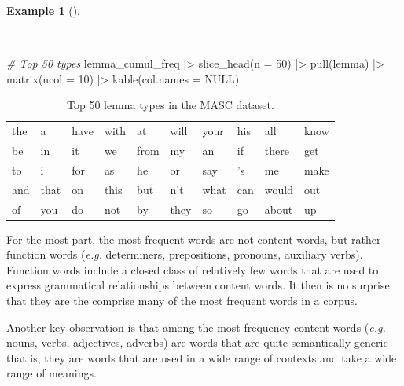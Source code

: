 \documentclass[
  letterpaper,
]{latex/krantz}
\newenvironment{Shaded}{\begin{snugshade}}{\end{snugshade}}
\newcommand{\AttributeTok}[1]{\textcolor[rgb]{0.00,0.00,0.00}{#1}}
\newcommand{\CommentTok}[1]{\textcolor[rgb]{0.00,0.00,0.00}{\textit{#1}}}
\newcommand{\ConstantTok}[1]{\textcolor[rgb]{0.00,0.00,0.00}{#1}}
\newcommand{\DecValTok}[1]{\textcolor[rgb]{0.00,0.00,0.00}{#1}}
\newcommand{\FunctionTok}[1]{\textcolor[rgb]{0.00,0.00,0.00}{#1}}
\newcommand{\NormalTok}[1]{\textcolor[rgb]{0.00,0.00,0.00}{#1}}
\newcommand{\SpecialCharTok}[1]{\textcolor[rgb]{0.00,0.00,0.00}{#1}}
\theoremstyle{definition}
\newtheorem{example}{Example}[chapter]
\theoremstyle{remark}
\begin{document}
\begin{example}[]\protect\hypertarget{exm-eda-masc-count-top-50}{}\label{exm-eda-masc-count-top-50}

~

\begin{Shaded}
\begin{Highlighting}[]
\CommentTok{\# Top 50 types}
\NormalTok{lemma\_cumul\_freq }\SpecialCharTok{|\textgreater{}}
  \FunctionTok{slice\_head}\NormalTok{(}\AttributeTok{n =} \DecValTok{50}\NormalTok{) }\SpecialCharTok{|\textgreater{}}
  \FunctionTok{pull}\NormalTok{(lemma) }\SpecialCharTok{|\textgreater{}}
  \FunctionTok{matrix}\NormalTok{(}\AttributeTok{ncol =} \DecValTok{10}\NormalTok{) }\SpecialCharTok{|\textgreater{}}
  \FunctionTok{kable}\NormalTok{(}\AttributeTok{col.names =} \ConstantTok{NULL}\NormalTok{)}
\end{Highlighting}
\end{Shaded}

\begin{longtable}[]{@{}llllllllll@{}}

\caption{\label{tbl-eda-masc-count-top-50}Top 50 lemma types in the MASC
dataset.}

\tabularnewline

\toprule\noalign{}
\endhead
\bottomrule\noalign{}
\endlastfoot
the & a & have & with & at & will & your & his & all & know \\
be & in & it & we & from & my & an & if & there & get \\
to & i & for & as & he & or & say & 's & me & make \\
and & that & on & this & but & n't & what & can & would & out \\
of & you & do & not & by & they & so & go & about & up \\

\end{longtable}

\end{example}

For the most part, the most frequent words are not content words, but
rather function words (\emph{e.g.} determiners, prepositions, pronouns,
auxiliary verbs). Function words include a closed class of relatively
few words that are used to express grammatical relationships between
content words. It then is no surprise that they are the comprise many of
the most frequent words in a corpus.

Another key observation is that among the most frequency content words
(\emph{e.g.} nouns, verbs, adjectives, adverbs) are words that are quite
semantically generic --that is, they are words that are used in a wide
range of contexts and take a wide range of meanings.
\end{document}
